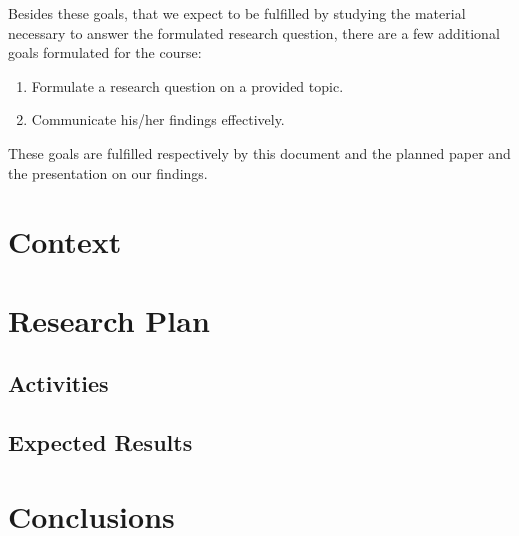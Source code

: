 			Besides these goals, that we expect to be fulfilled by studying the material necessary
			to answer the formulated research question, there are a few additional goals formulated
			for the course:

			\begin{enumerate}
				\item Formulate a research question on a provided topic.
				\item Communicate his/her findings effectively.
			\end{enumerate}

			These goals are fulfilled respectively by this document and the planned paper and the
			presentation on our findings.

	\section{Context}

	\section{Research Plan}

		\subsection{Activities}

		\subsection{Expected Results}

	\section{Conclusions}



